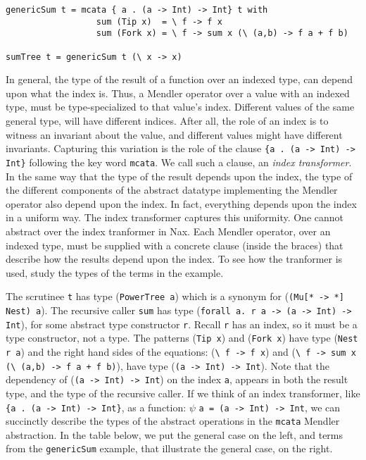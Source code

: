 {\small
\begin{verbatim}
genericSum t = mcata { a . (a -> Int) -> Int} t with
                  sum (Tip x)  = \ f -> f x
                  sum (Fork x) = \ f -> sum x (\ (a,b) -> f a + f b)

sumTree t = genericSum t (\ x -> x)
\end{verbatim}

In general, the type of the result of a function over an indexed type,
can depend upon what the index is. Thus, a Mendler operator over a value
with an indexed type, must be type-specialized to that value's index. Different values of the
same general type, will have different indices. After all, the role of
an index is to witness an invariant about the value, and different
values might have different invariants. Capturing this variation is the role of 
the  clause \verb+{a . (a -> Int) -> Int}+ following the key word \verb+mcata+. 
We call such a clause, an {\it index transformer}. In
the same way that the type of the result depends upon the index, the type of
the different components of the abstract datatype implementing the Mendler
operator also depend upon the index. In fact, everything depends upon the index
in a uniform way. The index transformer captures this uniformity.
One cannot abstract over the index tranformer in Nax. Each Mendler operator, over
an indexed type, must be supplied with a concrete clause (inside the braces)
that describe how the results depend upon the index. To see how the tranformer
is used, study the types of the terms in the example.

The scrutinee \verb+t+ has type (\verb+PowerTree a+) which is a synonym for
(\verb+(Mu[* -> *] Nest) a+). The recursive caller
\verb+sum+ has type (\verb+forall a. r a -> (a -> Int) -> Int+), for some abstract
type constructor \verb+r+. Recall \verb+r+ has an index, so it must be a type constructor, not a type. 
The patterns (\verb+Tip x+) and (\verb+Fork x+) have type
(\verb+Nest r a+) and the right hand sides of the equations:
(\verb+\ f -> f x+) and (\verb!\ f -> sum x (\ (a,b) -> f a + f b)!), have type
(\verb+(a -> Int) -> Int+). Note that the dependency of (\verb+(a -> Int) -> Int+) on
the index \verb+a+, appears in both the result type, and the type of the recursive caller.
If we think of an index transformer, like \verb+{a . (a -> Int) -> Int}+, as a function:
$\psi$ \verb+a = (a -> Int) -> Int+, we can succinctly
describe the types of the abstract operations in the \verb+mcata+ Mendler abstraction.
In the table below, we put the general case on the left, and
terms from the \verb+genericSum+ example, that illustrate the general case, on the right.

}
